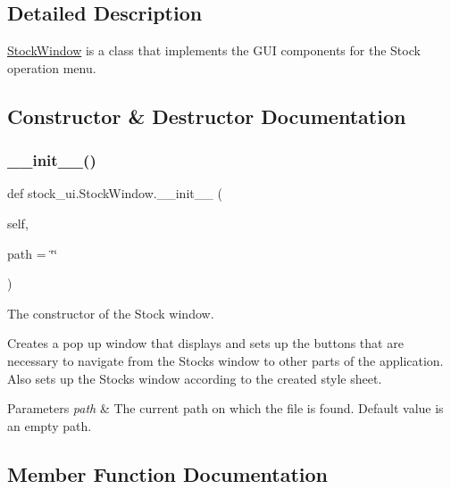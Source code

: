 \subsection{Detailed Description}
\hyperlink{classstock__ui_1_1_stock_window}{Stock\+Window} is a class that implements the G\+UI components for the Stock operation menu. 

\subsection{Constructor \& Destructor Documentation}
\mbox{\label{classstock__ui_1_1_stock_window_a7347eaa350a1387847c614c65ef35718}} 
\subsubsection{\texorpdfstring{\+\_\+\+\_\+init\+\_\+\+\_\+()}{\_\_init\_\_()}}
{\footnotesize\ttfamily def stock\+\_\+ui.\+Stock\+Window.\+\_\+\+\_\+init\+\_\+\+\_\+ (\begin{DoxyParamCaption}\item[{}]{self,  }\item[{}]{path = {\ttfamily \char`\"{}\char`\"{}} }\end{DoxyParamCaption})}



The constructor of the Stock window. 

Creates a pop up window that displays and sets up the buttons that are necessary to navigate from the Stocks window to other parts of the application. Also sets up the Stocks window according to the created style sheet. 
\begin{DoxyParams}{Parameters}
{\em path} & The current path on which the file is found. Default value is an empty path. \\
\hline
\end{DoxyParams}


\subsection{Member Function Documentation}
\mbox{\label{classstock__ui_1_1_stock_window_a81a932663d0fdf4674729367ce8f5d4e}} 

